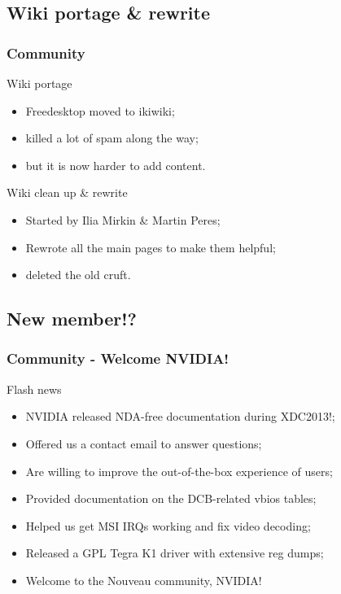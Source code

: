 \documentclass[11pt,english,compress]{beamer}
\begin{document}
\subsection{Wiki portage \& rewrite}
\begin{frame}
	\frametitle{Community}

	\begin{block}{Wiki portage}
		\begin{itemize}
			\item Freedesktop moved to ikiwiki;
			\item killed a lot of spam along the way;
			\item but it is now harder to add content.
		\end{itemize}
	\end{block}

	\begin{block}{Wiki clean up \& rewrite}
		\begin{itemize}
			\item Started by Ilia Mirkin \& Martin Peres;
			\item Rewrote all the main pages to make them helpful;
			\item deleted the old cruft.
		\end{itemize}
	\end{block}
\end{frame}

\subsection{New member!?}
\begin{frame}
	\frametitle{Community - Welcome NVIDIA!}

	\begin{block}{Flash news}
		\begin{itemize}
			\item NVIDIA released NDA-free documentation during
XDC2013!;
			\item Offered us a contact email to answer questions;
			\item Are willing to improve the out-of-the-box
experience of users;
			\item Provided documentation on the DCB-related vbios
tables;
			\item Helped us get MSI IRQs working and fix video
decoding;
			\item Released a GPL Tegra K1 driver with extensive reg
dumps;
			\item Welcome to the Nouveau community, NVIDIA!
		\end{itemize}
	\end{block}
\end{frame}

\end{document}
